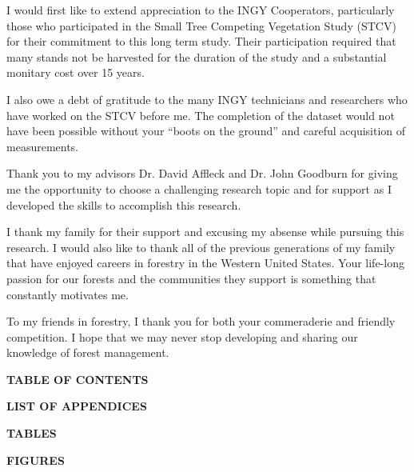 \documentclass[11pt, letterpaper, fleqn]{article}
\begin{document}
I would first like to extend appreciation to the INGY Cooperators, particularly those who participated in the Small Tree Competing Vegetation Study (STCV) for their commitment to this long term study. Their participation required that many stands not be harvested for the duration of the study and a substantial monitary cost over 15 years.

I also owe a debt of gratitude to the many INGY technicians and researchers who have worked on the STCV before me. The completion of the dataset would not have been possible without your ``boots on the ground'' and careful acquisition of measurements.

Thank you to my advisors Dr. David Affleck and Dr. John Goodburn for giving me the opportunity to choose a challenging research topic and for support as I developed the skills to accomplish this research.

I thank my family for their support and excusing my absense while pursuing this research.  I would also like to thank all of the previous generations of my family that have enjoyed careers in forestry in the Western United States.  Your life-long passion for our forests and the communities they support is something that constantly motivates me.

To my friends in forestry, I thank you for both your commeraderie and friendly competition. I hope that we may never stop developing and sharing our knowledge of forest management. 






\newpage
\large 
\begin{center}
\textbf{TABLE OF CONTENTS}\\[1pt]
\end{center}

\normalsize
\tableofcontents*
\large 
\begin{center}
\textbf{LIST OF APPENDICES}\\[1pt]
\end{center}
\listofappendices

\newpage
\large 
\begin{center}
\textbf{TABLES}\\[1pt]
\end{center}
\normalsize
\listoftables
\normalsize

\newpage
\large 
\begin{center}
\textbf{FIGURES}\\[1pt]
\end{center}
\normalsize
\listoffigures
\end{document}
